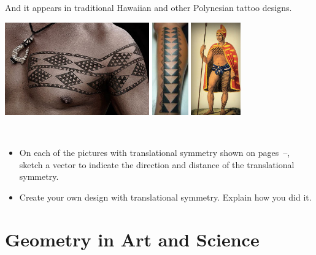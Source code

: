 \noindent
And it appears in traditional Hawaiian and other Polynesian tattoo designs.

\begin{center}\label{pic:translast}
\includegraphics[height=4cm]{frieze8}
\qquad
\includegraphics[height=4cm]{frieze9}
\qquad
\includegraphics[height=4cm]{frieze10}
\end{center}


\begin{thinkpair*}\ 
\begin{itemize}
\item
On each of the pictures with translational symmetry shown on pages~\pageref{pic:trans1}--\pageref{pic:translast}, sketch a vector to indicate the direction and distance of the translational symmetry.\\

\item
Create your own design with translational symmetry.  Explain how you did it.
\end{itemize}
\end{thinkpair*}


\newpage






\section{Geometry in Art and Science}\label{sec:artsci}


